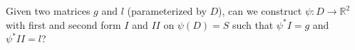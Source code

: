 \documentclass[10pt]{article}
\begin{document}
            Given two matrices $g$ and $l$ (parameterized by $D$), can we construct $\psi: D\rightarrow\mathbb{R}^2$ with first and second form $I$ and $II$ on $\psi(D) = S$ such that $\psi^*I = g$ and $\psi^*II = l$?
\end{document}
